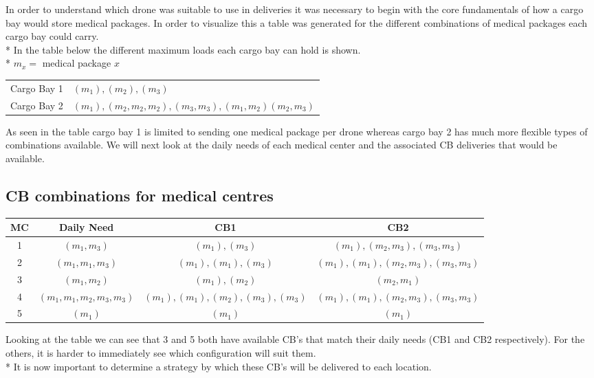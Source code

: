 \documentclass[a4paper,12pt]{article}
\begin{document}
In order to understand which drone was suitable to use in deliveries it was necessary to begin with the core fundamentals
of how a cargo bay would store medical packages. In order to visualize this a table was generated for the
different combinations of medical packages each cargo bay could carry.\\*
In the table below the different maximum loads each cargo bay can hold is shown.\\*
$m_x =$ medical package $x$


\begin{center}
\begin{tabular}{ |c|l| }
 \hline
 Cargo Bay 1 & ${(m_1),(m_2),(m_3)}$  \\
 Cargo Bay 2 & ${(m_1),(m_2,m_2,m_2),(m_3,m_3),(m_1,m_2)(m_2,m_3)}$  \\
 \hline
\end{tabular}
\end{center}

As seen in the table cargo bay 1 is limited to sending one medical package per drone whereas cargo bay 2 has much
more flexible types of combinations available.
We will next look at the daily needs of each medical center and the associated CB deliveries that would be available.

\subsection{CB combinations for medical centres}
\begin{center}
\begin{tabular}{ |c|c|c|c| }
 \hline
 MC & Daily Need & CB1 & CB2 \\\hline
  1 & $(m_1,m_3)$ & $(m_1),(m_3)$ & $(m_1),(m_2,m_3),(m_3,m_3)$  \\
  2 & $(m_1,m_1,m_3)$ & $(m_1),(m_1),(m_3)$ & $(m_1),(m_1),(m_2,m_3),(m_3,m_3)$  \\
  3 & $(m_1,m_2)$ & $(m_1),(m_2)$ & $ (m_2,m_1)$  \\
  4 & $(m_1,m_1,m_2,m_3,m_3)$ & $(m_1),(m_1),(m_2),(m_3),(m_3)$ & $(m_1),(m_1),(m_2,m_3),(m_3,m_3)$  \\
  5 & $(m_1)$ & $(m_1)$ & $(m_1)$  \\
 \hline
\end{tabular}
\end{center}
Looking at the table we can see that 3 and 5 both have available CB's that match their daily needs (CB1 and CB2 respectively).
For the others, it is harder to immediately see which configuration will suit them.\\*
It is now important to determine a strategy by which these CB's will be delivered to each location.
\end{document}
